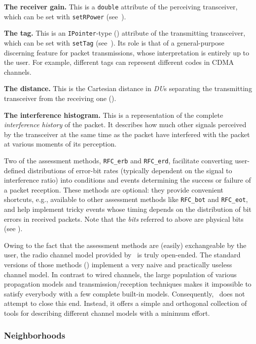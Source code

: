 \noindent
{\bf The receiver gain.}
This is a {\tt double} attribute of the perceiving transceiver, which can be
set with {\tt setRPower} (see~).

\noindent
{\bf The tag.}
This is an {\tt IPointer}-type ()
attribute of the transmitting transceiver, which can be
set with {\tt setTag} (see~).
Its role is that of a general-purpose discerning feature for packet
transmissions, whose interpretation is entirely up to the user.
For example, different tags can represent different codes in CDMA channels.

\noindent
{\bf The distance.}
This is the Cartesian distance in {\em DU\/}s
separating the transmitting transceiver from
the receiving one ().

\noindent
{\bf The interference histogram.}
This is a representation of the complete {\em interference history\/} of
the packet.
It describes how much other signals perceived by the transceiver at the
same time as the packet have interfered with the packet at various moments of
its perception.

Two of the assessment methods, {\tt RFC\_erb} and {\tt RFC\_erd}, facilitate
converting user-defined distributions of error-bit rates (typically dependent
on the signal to interference ratio) into conditions and events determining
the success or failure of a packet reception.
These methods are optional: they provide convenient shortcuts, e.g., available
to other assessment methods like {\tt RFC\_bot} and {\tt RFC\_eot},
and help implement
tricky events whose timing depends on the distribution of bit errors in
received packets.
Note that the {\em bits\/} referred to above are physical bits
(see ).

Owing to the fact that the assessment methods are (easily) exchangeable by the
user, the radio channel model provided by \smurph\ is truly open-ended.
The standard versions of those methods ()
implement a very naive and practically useless channel model.
In contrast to wired channels, the large population of various propagation
models and transmission/reception techniques
makes it impossible to satisfy everybody with a few complete built-in models.
Consequently, \smurph\ does not attempt to close this end.
Instead, it offers a simple and orthogonal collection of tools for
describing different channel models with a minimum effort.

\subsubsection{Neighborhoods}
\label{rm_tr_ra_ne}

